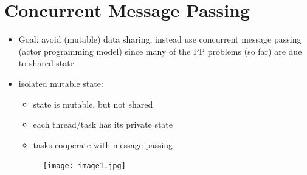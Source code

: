 \documentclass[a4paper]{article}
\begin{document}
\section{Concurrent Message Passing}
\begin{itemize}
\item Goal: avoid (mutable) data sharing, instead use concurrent message passing (actor programming model) since many of the PP problems (so far) are due to shared state
\item isolated mutable state: 
\begin{itemize}
\item state is mutable, but not shared
\item each thread/task has its private state
\item tasks cooperate with message passing
\end{itemize}
 \begin{figure}[ht]
\centering
\texttt{[image: image1.jpg]}
\end{figure}


\end{itemize}
\end{document}
